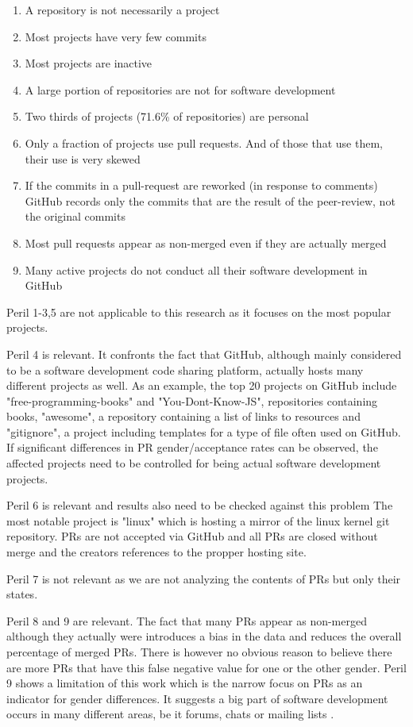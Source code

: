 \begin{enumerate}
	\item  A repository is not necessarily a project
	\item  Most projects have very few commits
	\item  Most projects are inactive
	\item  A large portion of repositories are not for software development
	\item  Two thirds of projects (71.6\% of repositories) are personal
	\item  Only a fraction of projects use pull requests. And of those that use them, their use is very skewed
	\item  If the commits in a pull-request are reworked (in response to comments) GitHub records only the commits that are the result of the peer-review, not the original commits
	\item  Most pull requests appear as non-merged even if they are actually merged
	\item  Many active projects do not conduct all their software development in GitHub
\end{enumerate}

Peril 1-3,5 are not applicable to this research as it focuses on the most popular projects.

Peril 4 is relevant. It confronts the fact that GitHub, although mainly considered to be a software development code sharing platform, actually hosts many different projects as well. As an example, the top 20 projects on GitHub include "free-programming-books" and "You-Dont-Know-JS", repositories containing books, "awesome", a repository containing a list of links to resources and "gitignore", a project including templates for a type of file often used on GitHub. If significant differences in \ac{PR} gender/acceptance rates can be observed, the affected projects need to be controlled for being actual software development projects.

Peril 6 is relevant and results also need to be checked against this problem The most notable project is "linux" which is hosting a mirror of the linux kernel git repository. \ac{PR}s are not accepted via GitHub and all \ac{PR}s are closed without merge and the creators references to the propper hosting site.

Peril 7 is not relevant as we are not analyzing the contents of \ac{PR}s but only their states.

Peril 8 and 9 are relevant. The fact that many \ac{PR}s appear as non-merged although they actually were introduces a bias in the data and reduces the overall percentage of merged \ac{PR}s. There is however no obvious reason to believe there are more \ac{PR}s that have this false negative value for one or the other gender. Peril 9 shows a limitation of this work which is the narrow focus on \ac{PR}s as an indicator for gender differences. It suggests a big part of software development occurs in many different areas, be it forums, chats or mailing lists \cite{perils-github:2015}.

